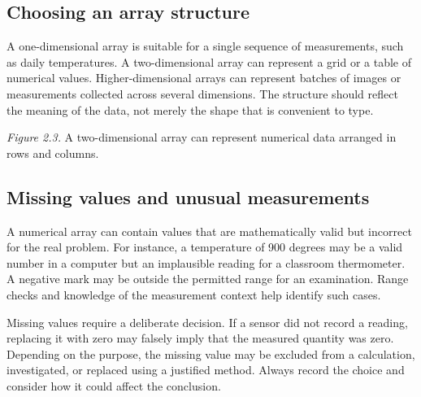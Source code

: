 \documentclass[11pt,openany,oneside]{book}
\begin{document}
\subsection{Choosing an array structure}
A one-dimensional array is suitable for a single sequence of measurements, such as daily temperatures. A two-dimensional array can represent a grid or a table of numerical values. Higher-dimensional arrays can represent batches of images or measurements collected across several dimensions. The structure should reflect the meaning of the data, not merely the shape that is convenient to type.

\begin{center}
\end{center}
\textit{Figure 2.3.} A two-dimensional array can represent numerical data arranged in rows and columns.

\subsection{Missing values and unusual measurements}
A numerical array can contain values that are mathematically valid but incorrect for the real problem. For instance, a temperature of 900 degrees may be a valid number in a computer but an implausible reading for a classroom thermometer. A negative mark may be outside the permitted range for an examination. Range checks and knowledge of the measurement context help identify such cases.

Missing values require a deliberate decision. If a sensor did not record a reading, replacing it with zero may falsely imply that the measured quantity was zero. Depending on the purpose, the missing value may be excluded from a calculation, investigated, or replaced using a justified method. Always record the choice and consider how it could affect the conclusion.
\end{document}
